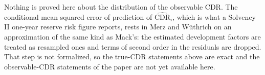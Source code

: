 Nothing is proved here about the distribution of the observable CDR. The conditional mean squared
error of prediction of $\widehat{\mathrm{CDR}}_i$, which is what a Solvency II one-year reserve
risk figure reports, rests in Merz and Wüthrich on an approximation of the same kind as Mack's:
the estimated development factors are treated as resampled ones and terms of second order in the
residuals are dropped. That step is not formalized, so the true-CDR statements above are exact
and the observable-CDR statements of the paper are not yet available here.
